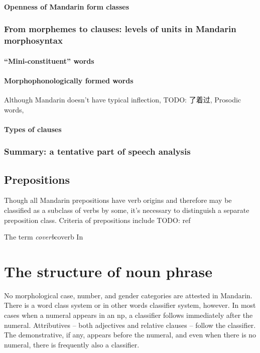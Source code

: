 \documentclass[UTF8, a4paper, oneside, scheme=plain]{ctexrep}
\newcommand*{\term}[1]{\emph{#1}}
\begin{document}
\subsubsection{Openness of Mandarin form classes}

\subsection{From morphemes to clauses: levels of units in Mandarin morphosyntax}

\subsubsection{``Mini-constituent'' words}

\subsubsection{Morphophonologically formed words}

Although Mandarin doesn't have typical inflection, 
TODO: 了着过, Prosodic words, 

\subsubsection{Types of clauses}

\subsection{Summary: a tentative part of speech analysis}

\section{Prepositions}\label{sec:preposition-pos}

Though all Mandarin prepositions have verb origins 
and therefore may be classified as a subclass of verbs by some,
it's necessary to distinguish a separate preposition class.
Criteria of prepositions include TODO: ref

\begin{infobox}{The term \term{coverb}}{coverb}
    In 
\end{infobox}


\chapter{The structure of noun phrase}

No morphological case, number, and gender categories are attested in Mandarin.
There is a word class system or in other words classifier system, however.
In most cases when a numeral appears in an \ac{np},
a classifier follows immediately after the numeral.
Attributives -- both adjectives and relative clauses -- 
follow the classifier. %
The demonstrative, if any, appears before the numeral,
and even when there is no numeral,
there is frequently also a classifier.
\end{document}
